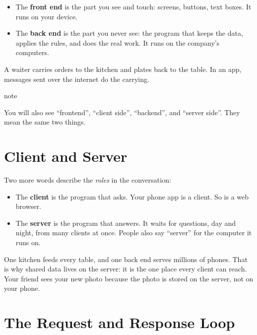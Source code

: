 \begin{itemize}
\tightlist
\item
  The \textbf{front end} is the part you see and touch: screens, buttons, text boxes. It runs on your device.
\item
  The \textbf{back end} is the part you never see: the program that keeps the data, applies the rules, and does the real work. It runs on the company's computers.
\end{itemize}

A waiter carries orders to the kitchen and plates back to the table. In an app, messages sent over the internet do the carrying.

\begin{callout}{note}

You will also see ``frontend'', ``client side'', ``backend'', and ``server side''. They mean the same two things.

\end{callout}

\section{Client and Server}\label{01-two-sides-of-every-app:client-and-server}

Two more words describe the \emph{roles} in the conversation:

\begin{itemize}
\tightlist
\item
  The \textbf{client} is the program that asks. Your phone app is a client. So is a web browser.
\item
  The \textbf{server} is the program that answers. It waits for questions, day and night, from many clients at once. People also say ``server'' for the computer it runs on.
\end{itemize}

One kitchen feeds every table, and one back end serves millions of phones. That is why shared data lives on the server: it is the one place every client can reach. Your friend sees your new photo because the photo is stored on the server, not on your phone.

\section{The Request and Response Loop}\label{01-two-sides-of-every-app:the-request-and-response-loop}

